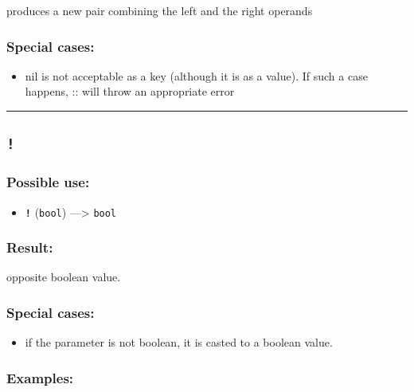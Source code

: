 \documentclass[]{book}
\providecommand{\tightlist}{%
  \setlength{\itemsep}{0pt}\setlength{\parskip}{0pt}}
\theoremstyle{definition}
\theoremstyle{definition}
\theoremstyle{definition}
\theoremstyle{remark}
\begin{document}
produces a new pair combining the left and the right operands

\subsubsection{Special cases:}\label{special-cases-1}

\begin{itemize}
\tightlist
\item
  nil is not acceptable as a key (although it is as a value). If such a
  case happens, :: will throw an appropriate error
\end{itemize}

\begin{center}\rule{0.5\linewidth}{\linethickness}\end{center}

\subsection{\texorpdfstring{\texttt{!}}{!}}\label{section-4}

\subsubsection{Possible use:}\label{possible-use-3}

\begin{itemize}
\tightlist
\item
  \textbf{\texttt{!}} (\texttt{bool}) ---\textgreater{} \texttt{bool}
\end{itemize}

\subsubsection{Result:}\label{result-2}

opposite boolean value.

\subsubsection{Special cases:}\label{special-cases-2}

\begin{itemize}
\tightlist
\item
  if the parameter is not boolean, it is casted to a boolean value.
\end{itemize}

\subsubsection{Examples:}\label{examples-1}
\end{document}
